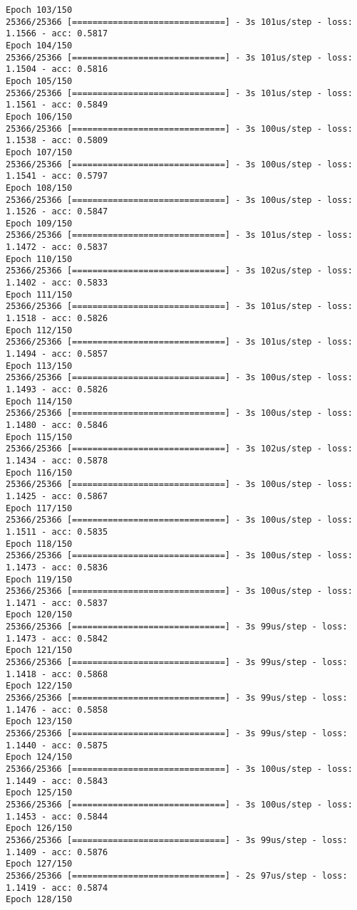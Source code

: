 \documentclass[11pt]{article}
\begin{document}
\begin{Verbatim}[commandchars=\\\{\}]
Epoch 103/150
25366/25366 [==============================] - 3s 101us/step - loss: 1.1566 - acc: 0.5817
Epoch 104/150
25366/25366 [==============================] - 3s 101us/step - loss: 1.1504 - acc: 0.5816
Epoch 105/150
25366/25366 [==============================] - 3s 101us/step - loss: 1.1561 - acc: 0.5849
Epoch 106/150
25366/25366 [==============================] - 3s 100us/step - loss: 1.1538 - acc: 0.5809
Epoch 107/150
25366/25366 [==============================] - 3s 100us/step - loss: 1.1541 - acc: 0.5797
Epoch 108/150
25366/25366 [==============================] - 3s 100us/step - loss: 1.1526 - acc: 0.5847
Epoch 109/150
25366/25366 [==============================] - 3s 101us/step - loss: 1.1472 - acc: 0.5837
Epoch 110/150
25366/25366 [==============================] - 3s 102us/step - loss: 1.1402 - acc: 0.5833
Epoch 111/150
25366/25366 [==============================] - 3s 101us/step - loss: 1.1518 - acc: 0.5826
Epoch 112/150
25366/25366 [==============================] - 3s 101us/step - loss: 1.1494 - acc: 0.5857
Epoch 113/150
25366/25366 [==============================] - 3s 100us/step - loss: 1.1493 - acc: 0.5826
Epoch 114/150
25366/25366 [==============================] - 3s 100us/step - loss: 1.1480 - acc: 0.5846
Epoch 115/150
25366/25366 [==============================] - 3s 102us/step - loss: 1.1434 - acc: 0.5878
Epoch 116/150
25366/25366 [==============================] - 3s 100us/step - loss: 1.1425 - acc: 0.5867
Epoch 117/150
25366/25366 [==============================] - 3s 100us/step - loss: 1.1511 - acc: 0.5835
Epoch 118/150
25366/25366 [==============================] - 3s 100us/step - loss: 1.1473 - acc: 0.5836
Epoch 119/150
25366/25366 [==============================] - 3s 100us/step - loss: 1.1471 - acc: 0.5837
Epoch 120/150
25366/25366 [==============================] - 3s 99us/step - loss: 1.1473 - acc: 0.5842
Epoch 121/150
25366/25366 [==============================] - 3s 99us/step - loss: 1.1418 - acc: 0.5868
Epoch 122/150
25366/25366 [==============================] - 3s 99us/step - loss: 1.1476 - acc: 0.5858
Epoch 123/150
25366/25366 [==============================] - 3s 99us/step - loss: 1.1440 - acc: 0.5875
Epoch 124/150
25366/25366 [==============================] - 3s 100us/step - loss: 1.1449 - acc: 0.5843
Epoch 125/150
25366/25366 [==============================] - 3s 100us/step - loss: 1.1453 - acc: 0.5844
Epoch 126/150
25366/25366 [==============================] - 3s 99us/step - loss: 1.1409 - acc: 0.5876
Epoch 127/150
25366/25366 [==============================] - 2s 97us/step - loss: 1.1419 - acc: 0.5874
Epoch 128/150

\end{Verbatim}
\end{document}
